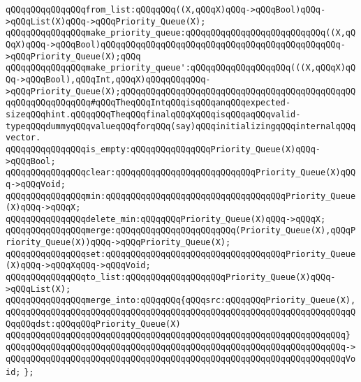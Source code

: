 \newline
\verb|qQQqqQQqqQQqqQQqfrom_list:qQQqqQQq((X,qQQqX)qQQq->qQQqBool)qQQq->qQQqList(X)qQQq->qQQqPriority_Queue(X);|\newline
\newline
\verb|qQQqqQQqqQQqqQQqmake_priority_queue:qQQqqQQqqQQqqQQqqQQqqQQqqQQq((X,qQQqX)qQQq->qQQqBool)qQQqqQQqqQQqqQQqqQQqqQQqqQQqqQQqqQQqqQQqqQQqqQQq->qQQqPriority_Queue(X);qQQq|\newline
\verb|qQQqqQQqqQQqqQQqmake_priority_queue':qQQqqQQqqQQqqQQqqQQq(((X,qQQqX)qQQq->qQQqBool),qQQqInt,qQQqX)qQQqqQQqqQQq->qQQqPriority_Queue(X);qQQqqQQqqQQqqQQqqQQqqQQqqQQqqQQqqQQqqQQqqQQqqQQqqQQqqQQqqQQqqQQq#qQQqTheqQQqIntqQQqisqQQqanqQQqexpected-sizeqQQqhint.qQQqqQQqTheqQQqfinalqQQqXqQQqisqQQqaqQQqvalid-typeqQQqdummyqQQqvalueqQQqforqQQq(say)qQQqinitializingqQQqinternalqQQqvector.|\newline
\newline
\verb|qQQqqQQqqQQqqQQqis_empty:qQQqqQQqqQQqqQQqPriority_Queue(X)qQQq->qQQqBool;|\newline
\verb|qQQqqQQqqQQqqQQqclear:qQQqqQQqqQQqqQQqqQQqqQQqqQQqPriority_Queue(X)qQQq->qQQqVoid;|\newline
\verb|qQQqqQQqqQQqqQQqmin:qQQqqQQqqQQqqQQqqQQqqQQqqQQqqQQqqQQqPriority_Queue(X)qQQq->qQQqX;|\newline
\verb|qQQqqQQqqQQqqQQqdelete_min:qQQqqQQqPriority_Queue(X)qQQq->qQQqX;|\newline
\verb|qQQqqQQqqQQqqQQqmerge:qQQqqQQqqQQqqQQqqQQqqQQq(Priority_Queue(X),qQQqPriority_Queue(X))qQQq->qQQqPriority_Queue(X);|\newline
\verb|qQQqqQQqqQQqqQQqset:qQQqqQQqqQQqqQQqqQQqqQQqqQQqqQQqqQQqPriority_Queue(X)qQQq->qQQqXqQQq->qQQqVoid;|\newline
\verb|qQQqqQQqqQQqqQQqto_list:qQQqqQQqqQQqqQQqqQQqPriority_Queue(X)qQQq->qQQqList(X);|\newline
\newline
\verb|qQQqqQQqqQQqqQQqmerge_into:qQQqqQQq{qQQqsrc:qQQqqQQqPriority_Queue(X),|\newline
\verb|qQQqqQQqqQQqqQQqqQQqqQQqqQQqqQQqqQQqqQQqqQQqqQQqqQQqqQQqqQQqqQQqqQQqqQQqqQQqdst:qQQqqQQqPriority_Queue(X)|\newline
\verb|qQQqqQQqqQQqqQQqqQQqqQQqqQQqqQQqqQQqqQQqqQQqqQQqqQQqqQQqqQQqqQQqqQQq}|\newline
\verb|qQQqqQQqqQQqqQQqqQQqqQQqqQQqqQQqqQQqqQQqqQQqqQQqqQQqqQQqqQQqqQQqqQQq->|\newline
\verb|qQQqqQQqqQQqqQQqqQQqqQQqqQQqqQQqqQQqqQQqqQQqqQQqqQQqqQQqqQQqqQQqqQQqVoid;|\newline
\verb|};|\newline
\newline

